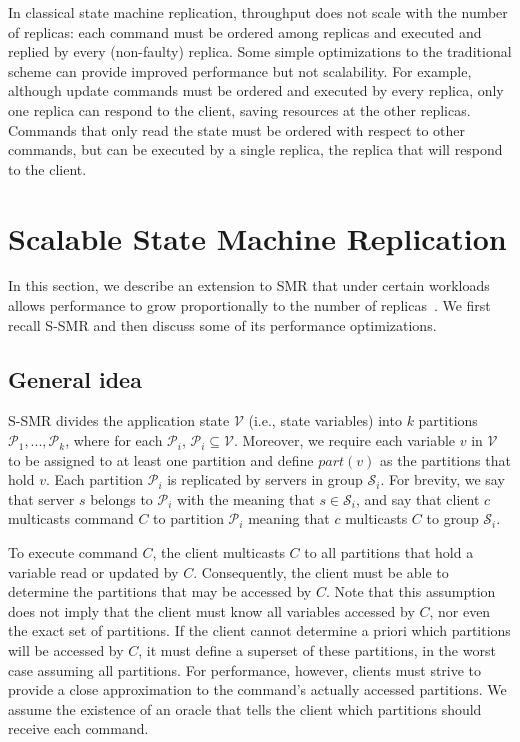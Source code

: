 \documentclass[11pt]{article}
\newcommand{\ppm}{\mathcal{P}}
\newcommand{\vvm}{\mathcal{V}}
\newcommand{\ssm}{\mathcal{S}}
\begin{document}
In classical state machine replication, throughput does not scale with the number of replicas: each command must be ordered among replicas and executed and replied by every (non-faulty) replica.
Some simple optimizations to the traditional scheme can provide improved performance but not scalability.
For example, although update commands must be ordered and executed by every replica, only one replica can respond to the client, saving resources at the other replicas.
Commands that only read the state must be ordered with respect to other commands, but can be executed by a single replica, the replica that will respond to the client.


\section{Scalable State Machine Replication}
\label{sec:scalablesmr}

In this section, we describe an extension to SMR that under certain workloads allows performance to grow proportionally to the number of replicas~\cite{bezerra2014ssmr}.
We first recall  S-SMR and then discuss some of its performance optimizations.

\subsection{General idea}
\label{sec:generalidea}

S-SMR divides the application state $\vvm$ (i.e., state variables) into $k$ partitions $\ppm_1, ..., \ppm_k$, where for each $\ppm_i$, $\ppm_i \subseteq \vvm$.
Moreover, we require each variable $v$ in $\vvm$ to be assigned to at least one partition and define $part(v)$ as the partitions that hold $v$.
Each partition $\ppm_i$ is replicated by servers in group $\ssm_i$.
For brevity, we say that server $s$ belongs to $\ppm_i$ with the meaning that $s \in \ssm_i$, and say that client $c$ multicasts command $C$ to partition $\ppm_i$ meaning that $c$ multicasts $C$ to group $\ssm_i$.

To execute command $C$, the client multicasts $C$ to all partitions that hold a variable read or updated by $C$.
Consequently, the client must be able to determine the partitions that may be accessed by $C$.
Note that this assumption does not imply that the client must know all variables accessed by $C$, nor even the exact set of partitions.
If the client cannot determine a priori which partitions will be accessed by $C$, it must define a superset of these partitions, in the worst case assuming all partitions.
For performance, however, clients must strive to provide a close approximation to the command's actually accessed partitions.
We assume the existence of an oracle that tells the client which partitions should receive each command.
\end{document}
